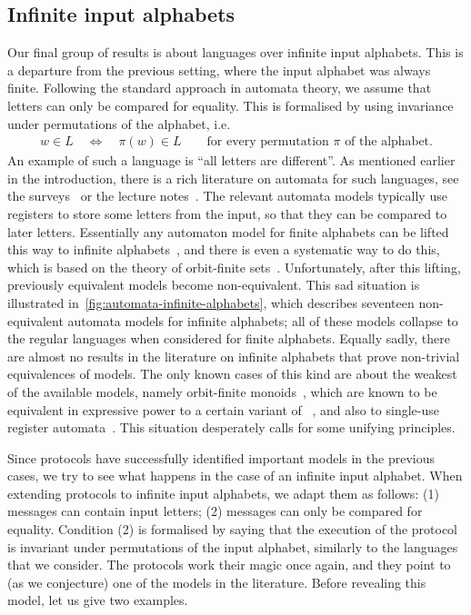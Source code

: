 \subsection{Infinite input alphabets}
\label{sec:intro-infinite}
Our final group of results is about languages over infinite input alphabets. This is a departure from the previous setting, where  the input alphabet was always finite. Following the standard approach in automata theory,  we assume that letters can only be compared for equality. This is formalised by using invariance under  permutations of the alphabet, i.e.
\begin{align*}
w \in L 
\quad \iff \quad
\pi(w) \in L \qquad \text{for every permutation $\pi$ of the alphabet}.
\end{align*}
An example of such a language is ``all letters are different''.
 As mentioned earlier in the introduction, there is a rich literature on automata for such languages, see the surveys~\cite{neven2003power,segoufin2006automata,bojanczykOrbitFiniteSetsTheir2017} or the lecture notes~\cite{bojanczyk_slightly}.  The  relevant automata models typically use registers to store some letters from the input, so that they can be compared to later letters. Essentially any automaton model for finite alphabets can be lifted this way to infinite alphabets~\cite[Figure 1]{neven2003power}, and there is even a systematic way to do this, which is based on the theory of orbit-finite sets~\cite[Chapter 2]{bojanczyk_slightly}. Unfortunately, after this lifting, previously equivalent models become non-equivalent.  This sad situation is illustrated in~\cref{fig:automata-infinite-alphabets}, which describes seventeen non-equivalent automata models for infinite alphabets; all of these models collapse to the regular languages when considered for finite alphabets. Equally sadly, there are almost no results in the literature on infinite alphabets that prove non-trivial equivalences of models. The only known cases of this kind are about the  weakest of the available models, namely orbit-finite monoids~\cite{bojanczykNominalMonoids2013}, which are known to be equivalent in expressive power to a certain variant of \mso~\cite[Theorems 4.2 and 5.1]{DBLP:journals/corr/ColcombetLP14}, and also to single-use register automata~\cite[Theorem 6]{bojanczykstefanski2020}.
This situation desperately calls for some unifying principles. 

Since protocols have successfully identified important models in the previous
cases, we try to see  what happens in the case of an infinite input alphabet.
When extending protocols to infinite input alphabets, we adapt them as follows:
(1) messages can contain input letters; (2)  messages can only be compared for
equality. Condition (2) is formalised by saying that the execution of the
protocol is invariant under permutations of the input alphabet, similarly to
the languages that we consider. The protocols  work their magic once again, and
they point to (as we conjecture)  one of the models in the literature. Before
revealing this model, let us give two examples.

